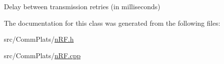 Delay between transmission retries (in milliseconds) 



The documentation for this class was generated from the following files\+:\begin{DoxyCompactItemize}
\item 
src/\+Comm\+Plats/\hyperlink{n_r_f_8h}{n\+R\+F.\+h}\item 
src/\+Comm\+Plats/\hyperlink{n_r_f_8cpp}{n\+R\+F.\+cpp}\end{DoxyCompactItemize}
